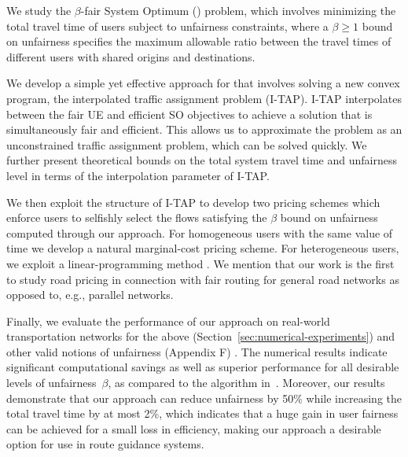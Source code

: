 \documentclass{article}
\newif\ifarxiv   %
\begin{document}
We study the $\beta$-fair System Optimum (\fso) problem, which involves minimizing the total travel time of users subject to unfairness constraints, where a $\beta\geq 1$ bound on unfairness specifies the maximum allowable ratio between the travel times of different users with shared origins and destinations. 

We develop a simple yet effective %
approach for \fso that involves solving a new convex program, the interpolated traffic assignment problem (I-TAP). I-TAP interpolates between the fair UE and efficient SO objectives to achieve a solution that is simultaneously fair and efficient. This allows us to approximate the \fso problem as an unconstrained traffic assignment problem, which can be solved quickly. We further present theoretical bounds on the total system travel time and unfairness level in terms of the interpolation parameter of I-TAP.


We then exploit the structure of I-TAP to develop two pricing schemes which enforce users to selfishly select the flows satisfying the $\beta$ bound on unfairness computed through our approach. \ifarxiv In particular, for \else For \fi homogeneous users with the same value of time we develop a natural marginal-cost pricing scheme. For heterogeneous users, we exploit a linear-programming method \cite{multicommodity-extension} \ifarxiv to derive prices that enforce the optimal flows computed through I-TAP\else\fi. We mention that our work is the first to study road pricing in connection with fair routing for general road networks as opposed to, e.g., parallel networks.

Finally, we evaluate the performance of our approach on real-world transportation networks for the above (Section~\ref{sec:numerical-experiments}) and other valid notions of unfairness \ifarxiv (Appendix~\ref{apdx:general-unfairness}) \else (Appendix F) \fi. The numerical results indicate significant computational savings as well as superior performance for all desirable levels of unfairness~$\beta$, as compared to the algorithm in~\cite{so-routing-seminal}. Moreover, our results demonstrate that our approach can reduce \ifarxiv the level of \fi unfairness by 50\% while increasing the total travel time by at most 2\%, which indicates that a huge gain in user fairness can be achieved for a small loss in %
efficiency, making our approach a desirable option for use in route guidance systems.
\end{document}
